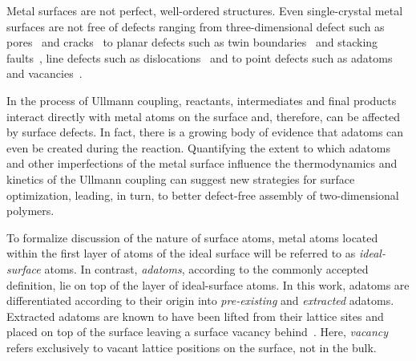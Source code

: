 \documentclass[%
 reprint,
 amsmath,amssymb,
 aps,
prb,
floatfix,
]{revtex4-2}
\newcommand{\lock}{\color{red}}
\newcommand{\lock}{\color{black}}
\begin{document}
{\lock

Metal surfaces are not perfect, well-ordered structures. Even single-crystal metal surfaces are not free of defects ranging from three-dimensional defect such as pores~\cite{ullmann_72} and cracks~\cite{ullmann_73} to planar defects such as twin boundaries~\cite{ullmann_74} and stacking faults~\cite{ullmann_75}, line defects such as dislocations~\cite{Ullmann_76} and to point defects such as adatoms~\cite{Ullmann_77} and vacancies~\cite{ullmann_78}.

In the process of Ullmann coupling, reactants, intermediates and final products interact directly with metal atoms on the surface and, therefore, can be affected by surface defects. 
In fact, there is a growing body of evidence that adatoms can even be created during the reaction. 
Quantifying the extent to which adatoms and other imperfections of the metal surface influence the thermodynamics and kinetics of the Ullmann coupling can suggest new strategies for surface optimization, leading, in turn, to better defect-free assembly of two-dimensional polymers. 


To formalize discussion of the nature of surface atoms, metal atoms located within the first layer of atoms of the ideal surface will be referred to as \emph{ideal-surface} atoms. In contrast, \emph{adatoms}, according to the commonly accepted definition, lie on top of the layer of ideal-surface atoms. In this work, adatoms are differentiated according to their origin into \emph{pre-existing} and \emph{extracted} adatoms. %
Extracted adatoms are known to have been lifted from their lattice sites and placed on top of the surface leaving a surface vacancy behind~\cite{ullmann_96}. Here, \emph{vacancy} refers exclusively to vacant lattice positions on the surface, not in the bulk.

}
\end{document}
